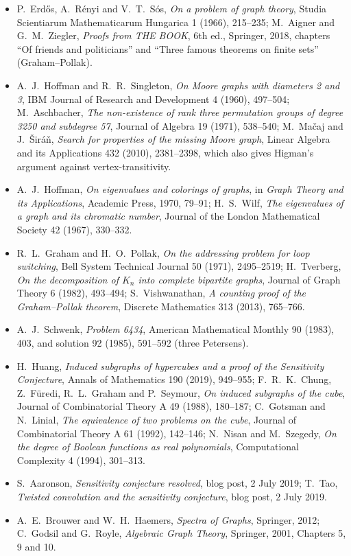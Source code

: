 \begin{itemize}
\item P.~Erd\H{o}s, A.~R\'enyi and V.~T.~S\'os, \emph{On a problem of graph theory}, Studia Scientiarum Mathematicarum Hungarica 1
(1966), 215--235; M.~Aigner and G.~M.~Ziegler, \emph{Proofs from THE BOOK}, 6th ed., Springer, 2018, chapters ``Of friends and
politicians'' and ``Three famous theorems on finite sets'' (Graham--Pollak).
\item A.~J.~Hoffman and R.~R.~Singleton, \emph{On Moore graphs with diameters 2 and 3}, IBM Journal of Research and Development 4 (1960),
497--504; M.~Aschbacher, \emph{The non-existence of rank three permutation groups of degree 3250 and subdegree 57}, Journal of Algebra 19
(1971), 538--540; M.~Ma\v caj and J.~\v Sir\'a\v n, \emph{Search for properties of the missing Moore graph}, Linear Algebra and its
Applications 432 (2010), 2381--2398, which also gives Higman's argument against vertex-transitivity.
\item A.~J.~Hoffman, \emph{On eigenvalues and colorings of graphs}, in \emph{Graph Theory and its Applications}, Academic Press, 1970,
79--91; H.~S.~Wilf, \emph{The eigenvalues of a graph and its chromatic number}, Journal of the London Mathematical Society 42 (1967),
330--332.
\item R.~L.~Graham and H.~O.~Pollak, \emph{On the addressing problem for loop switching}, Bell System Technical Journal 50 (1971),
2495--2519; H.~Tverberg, \emph{On the decomposition of $K_n$ into complete bipartite graphs}, Journal of Graph Theory 6 (1982), 493--494; S.~Vishwanathan, \emph{A counting proof of the Graham--Pollak theorem}, Discrete
Mathematics 313 (2013), 765--766.
\item A.~J.~Schwenk, \emph{Problem 6434}, American Mathematical Monthly 90 (1983), 403, and solution 92 (1985), 591--592 (three Petersens).
\item H.~Huang, \emph{Induced subgraphs of hypercubes and a proof of the Sensitivity Conjecture}, Annals of Mathematics 190 (2019),
949--955; F.~R.~K.~Chung, Z.~F\"uredi, R.~L.~Graham and P.~Seymour, \emph{On induced subgraphs of the cube}, Journal of Combinatorial
Theory A 49 (1988), 180--187; C.~Gotsman and N.~Linial, \emph{The equivalence of two problems on the cube}, Journal of Combinatorial Theory
A 61 (1992), 142--146; N.~Nisan and M.~Szegedy, \emph{On the degree of Boolean functions as real polynomials}, Computational Complexity 4
(1994), 301--313.
\item S.~Aaronson, \emph{Sensitivity conjecture resolved}, blog post, 2 July 2019; T.~Tao, \emph{Twisted convolution and the sensitivity
conjecture}, blog post, 2 July 2019.
\item A.~E.~Brouwer and W.~H.~Haemers, \emph{Spectra of Graphs}, Springer, 2012; C.~Godsil and G.~Royle, \emph{Algebraic Graph Theory},
Springer, 2001, Chapters 5, 9 and 10.
\end{itemize}

